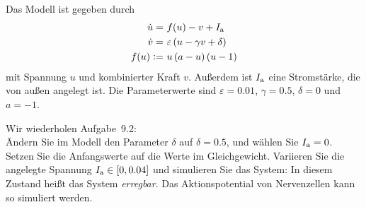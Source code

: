 \documentclass[11pt,a4paper]{article}
\begin{document}



\begin{aufg}
Das Modell ist gegeben durch
 \begin{align*}
  \dot{u}      =&\ f(u) - v + I_{\rm a}\\
  \dot{v}      =&\ \varepsilon \left(u - \gamma v + \delta\right)\\
  f(u) \coloneqq&\ u\left(a-u\right)\left(u-1\right)
\end{align*}
mit Spannung $u$ und kombinierter Kraft $v$.
Außerdem ist $I_{\rm a}$ eine Stromstärke, die von außen angelegt ist.
Die Parameterwerte sind $\varepsilon = 0.01$, $\gamma = 0.5$,
$\delta = 0$ und $a = -1$.
\medskip

Wir wiederholen Aufgabe~9.2:\\
Ändern Sie im Modell den Parameter $\delta$ auf $\delta = 0.5$,
und wählen Sie $I_{\rm a}=0$.
Setzen Sie die Anfangswerte auf die Werte im Gleichgewicht. Variieren Sie die
angelegte Spannung $I_{\rm a}\in [0,0.04]$ und simulieren Sie das System:
In diesem Zustand heißt das System \emph{erregbar}.
Das Aktionspotential von Nervenzellen kann so simuliert werden.
\end{aufg}

\bigskip%
\end{document}
